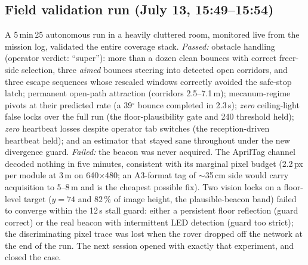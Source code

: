 \subsection{Field validation run (July 13, 15:49--15:54)}
\label{sec:field-validation}
A 5\,min\,25 autonomous run in a heavily cluttered room, monitored live
from the mission log, validated the entire coverage stack. \emph{Passed:}
obstacle handling (operator verdict: ``super''): more than a dozen clean
bounces with correct freer-side selection, three \emph{aimed} bounces
steering into detected open corridors, and three escape sequences whose
rescaled windows correctly avoided the safe-stop latch; permanent open-path
attraction (corridors 2.5--7.1\,m); mecanum-regime pivots at their
predicted rate (a 39$^\circ$ bounce completed in 2.3\,s); \emph{zero}
ceiling-light false locks over the full run (the floor-plausibility gate
and 240 threshold held); \emph{zero} heartbeat losses despite operator tab
switches (the reception-driven heartbeat held); and an estimator that
stayed sane throughout under the new divergence guard. \emph{Failed:} the
beacon was never acquired. The AprilTag channel decoded nothing in five
minutes, consistent with its marginal pixel budget (2.2\,px per module
at 3\,m on 640$\times$480; an A3-format tag of $\sim$35\,cm side would
carry acquisition to 5--8\,m and is the cheapest possible fix). Two
vision locks on a floor-level target ($y = 74$ and $82\,\%$ of image
height, the plausible-beacon band) failed to converge within the 12\,s
stall guard: either a persistent floor reflection (guard correct) or the
real beacon with intermittent LED detection (guard too strict); the
discriminating pixel trace was lost when the rover dropped off the network
at the end of the run. The next session opened with exactly that experiment, and closed the
case.

